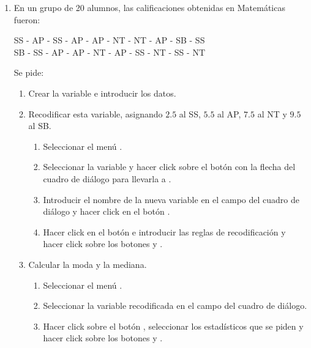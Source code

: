\begin{enumerate}[leftmargin=*]
\item En un grupo de 20 alumnos, las calificaciones obtenidas en
Matemáticas fueron:
\begin{center}
SS - AP - SS - AP - AP - NT - NT - AP - SB - SS \\
SB - SS - AP - AP - NT - AP - SS - NT - SS - NT
\end{center}

Se pide:

\begin{enumerate}
\item  Crear la variable  e introducir
los datos.

\item  Recodificar esta variable, asignando $2.5$ al
SS, $5.5$ al AP, $7.5$ al NT y $9.5$ al SB.
\begin{indicacion}
\begin{enumerate}
\item Seleccionar el menú .
\item Seleccionar la variable  y hacer click 
sobre el botón con la flecha del cuadro de diálogo para llevarla 
a . 
\item Introducir el nombre de la
nueva variable en el campo  del cuadro de diálogo y
hacer click en el botón . 
\item Hacer click en el botón  e 
introducir las reglas de recodificación y hacer click
sobre los botones  y .
\end{enumerate}
\end{indicacion}

\item  Calcular la moda y la mediana.
\begin{indicacion}
\begin{enumerate}
\item Seleccionar el menú . \item Seleccionar la variable
recodificada en el campo  del cuadro de diálogo.
\item Hacer click sobre el botón , seleccionar
los estadísticos que se piden y hacer click sobre los 
botones  y .
\end{enumerate}
\end{indicacion}
\end{enumerate}




\end{enumerate}
